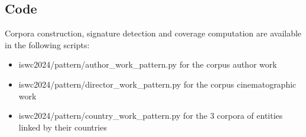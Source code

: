 \documentclass[runningheads]{llncs}
\begin{document}
\subsection{Code}
Corpora construction, signature detection and coverage computation are available in the following scripts:
\begin{itemize}
	\item iswc2024/pattern/author\_work\_pattern.py for the corpus author work
	\item iswc2024/pattern/director\_work\_pattern.py for the corpus cinematographic work
	\item iswc2024/pattern/country\_work\_pattern.py for the 3 corpora of entities linked by their countries 
\end{itemize}
\end{document}
